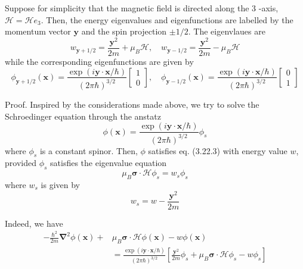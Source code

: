 \documentclass{article}
\begin{document}
Suppose for simplicity that the magnetic field is directed along the 3 -axis, $\mathcal{H}=\mathcal{H} e_{3}$. Then, the energy eigenvalues and eigenfunctions are labelled by the momentum vector $\boldsymbol{y}$ and the spin projection $\pm 1 / 2$. The eigenvlaues are
$$
\begin{equation*}
w_{\boldsymbol{y}+1 / 2}=\frac{\boldsymbol{y}^{2}}{2 m}+\mu_{B} \mathcal{H}, \quad w_{\boldsymbol{y}-1 / 2}=\frac{\boldsymbol{y}^{2}}{2 m}-\mu_{B} \mathcal{H} \tag{3.22.4}
\end{equation*}
$$
while the corresponding eigenfunctions are given by
$$
\phi_{\boldsymbol{y}+1 / 2}(\boldsymbol{x})=\frac{\exp (i \boldsymbol{y} \cdot \boldsymbol{x} / \hbar)}{(2 \pi \hbar)^{3 / 2}}\left[\begin{array}{l}
1  \tag{3.22.5}\\
0
\end{array}\right], \quad \phi_{\boldsymbol{y}-1 / 2}(\boldsymbol{x})=\frac{\exp (i \boldsymbol{y} \cdot \boldsymbol{x} / \hbar)}{(2 \pi \hbar)^{3 / 2}}\left[\begin{array}{l}
0 \\
1
\end{array}\right]
$$

Proof. Inspired by the considerations made above, we try to solve the Schroedinger equation through the anstatz
$$
\begin{equation*}
\phi(\boldsymbol{x})=\frac{\exp (i \boldsymbol{y} \cdot \boldsymbol{x} / \hbar)}{(2 \pi \hbar)^{3 / 2}} \phi_{s} \tag{3.22.6}
\end{equation*}
$$
where $\phi_{s}$ is a constant spinor. Then, $\phi$ satisfies eq. (3.22.3) with energy value $w$, provided $\phi_{s}$ satisfies the eigenvalue equation
$$
\begin{equation*}
\mu_{B} \boldsymbol{\sigma} \cdot \mathcal{H} \phi_{s}=w_{s} \phi_{s} \tag{3.22.7}
\end{equation*}
$$
where $w_{s}$ is given by
$$
\begin{equation*}
w_{s}=w-\frac{\boldsymbol{y}^{2}}{2 m} \tag{3.22.8}
\end{equation*}
$$

Indeed, we have
$$
\begin{align*}
-\frac{\hbar^{2}}{2 m} \boldsymbol{\nabla}^{2} \phi(\boldsymbol{x})+ & \mu_{B} \boldsymbol{\sigma} \cdot \boldsymbol{\mathcal { H }} \phi(\boldsymbol{x})-w \phi(\boldsymbol{x})  \tag{3.22.9}\\
& =\frac{\exp (i \boldsymbol{y} \cdot \boldsymbol{x} / \hbar)}{(2 \pi \hbar)^{3 / 2}}\left[\frac{\boldsymbol{y}^{2}}{2 m} \phi_{s}+\mu_{B} \boldsymbol{\sigma} \cdot \boldsymbol{\mathcal { H }} \phi_{s}-w \phi_{s}\right]
\end{align*}
$$
\end{document}
